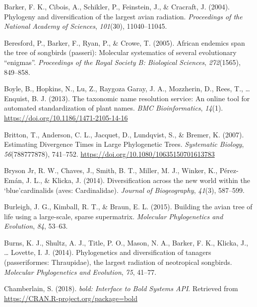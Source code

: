 \documentclass[english,man]{apa6}
\begin{document}
\leavevmode\hypertarget{ref-barker2004phylogeny}{}%
Barker, F. K., Cibois, A., Schikler, P., Feinstein, J., \& Cracraft, J. (2004). Phylogeny and diversification of the largest avian radiation. \emph{Proceedings of the National Academy of Sciences}, \emph{101}(30), 11040--11045.

\leavevmode\hypertarget{ref-beresford2005african}{}%
Beresford, P., Barker, F., Ryan, P., \& Crowe, T. (2005). African endemics span the tree of songbirds (passeri): Molecular systematics of several evolutionary ``enigmas''. \emph{Proceedings of the Royal Society B: Biological Sciences}, \emph{272}(1565), 849--858.

\leavevmode\hypertarget{ref-Boyle2013}{}%
Boyle, B., Hopkins, N., Lu, Z., Raygoza Garay, J. A., Mozzherin, D., Rees, T., \ldots{} Enquist, B. J. (2013). The taxonomic name resolution service: An online tool for automated standardization of plant names. \emph{BMC Bioinformatics}, \emph{14}(1). \url{https://doi.org/10.1186/1471-2105-14-16}

\leavevmode\hypertarget{ref-Britton2007}{}%
Britton, T., Anderson, C. L., Jacquet, D., Lundqvist, S., \& Bremer, K. (2007). Estimating Divergence Times in Large Phylogenetic Trees. \emph{Systematic Biology}, \emph{56}(788777878), 741--752. \url{https://doi.org/10.1080/10635150701613783}

\leavevmode\hypertarget{ref-bryson2014diversification}{}%
Bryson Jr, R. W., Chaves, J., Smith, B. T., Miller, M. J., Winker, K., Pérez-Emán, J. L., \& Klicka, J. (2014). Diversification across the new world within the `blue'cardinalids (aves: Cardinalidae). \emph{Journal of Biogeography}, \emph{41}(3), 587--599.

\leavevmode\hypertarget{ref-burleigh2015building}{}%
Burleigh, J. G., Kimball, R. T., \& Braun, E. L. (2015). Building the avian tree of life using a large-scale, sparse supermatrix. \emph{Molecular Phylogenetics and Evolution}, \emph{84}, 53--63.

\leavevmode\hypertarget{ref-burns2014phylogenetics}{}%
Burns, K. J., Shultz, A. J., Title, P. O., Mason, N. A., Barker, F. K., Klicka, J., \ldots{} Lovette, I. J. (2014). Phylogenetics and diversification of tanagers (passeriformes: Thraupidae), the largest radiation of neotropical songbirds. \emph{Molecular Phylogenetics and Evolution}, \emph{75}, 41--77.

\leavevmode\hypertarget{ref-Chamberlain2018}{}%
Chamberlain, S. (2018). \emph{bold: Interface to Bold Systems API}. Retrieved from \url{https://CRAN.R-project.org/package=bold}
\end{document}
